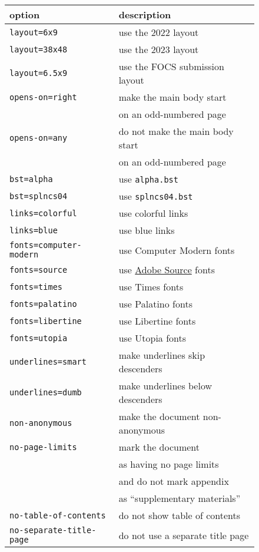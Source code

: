 \begin{figure}
\centering
\capstart
\begin{tabular}{ll}
\toprule
\textbf{option} & \textbf{description} \\
\midrule
\texttt{layout=6x9} & use the 2022 layout \\
\texttt{layout=38x48} & use the 2023 layout \\
\texttt{layout=6.5x9} & use the FOCS submission layout \\
\texttt{opens-on=right} & make the main body start \\
& \qquad on an odd-numbered page \\
\texttt{opens-on=any} & do not make the main body start \\
& \qquad on an odd-numbered page \\
\texttt{bst=alpha} & use \texttt{alpha.bst} \\
\texttt{bst=splncs04} & use \texttt{splncs04.bst} \\
\texttt{links=colorful} & use colorful links \\
\texttt{links=blue} & use blue links \\
\texttt{fonts=computer-modern} & use Computer Modern fonts \\
\texttt{fonts=source} &
use \href{https://github.com/adobe-fonts}{Adobe Source} fonts \\
\texttt{fonts=times} & use Times fonts \\
\texttt{fonts=palatino} & use Palatino fonts \\
\texttt{fonts=libertine} & use Libertine fonts \\
\texttt{fonts=utopia} & use Utopia fonts \\
\texttt{underlines=smart} & make underlines skip descenders \\
\texttt{underlines=dumb} & make underlines below descenders \\
\texttt{non-anonymous} & make the document non-anonymous \\
\texttt{no-page-limits} & mark the document \\
& \qquad as having no page limits \\
& \quad and do not mark appendix \\
& \qquad as ``supplementary materials'' \\
\texttt{no-table-of-contents} & do not show table of contents \\
\texttt{no-separate-title-page} & do not use a separate title page \\

\end{tabular}
\end{figure}
